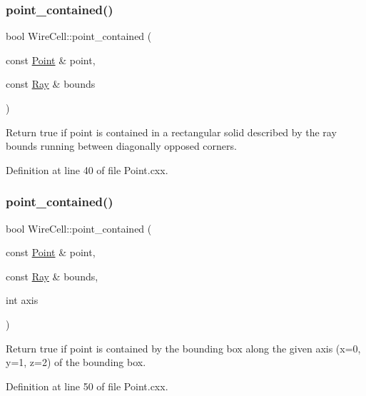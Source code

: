 \subsubsection{\texorpdfstring{point\+\_\+contained()}{point\_contained()}\hspace{0.1cm}{\footnotesize\ttfamily [1/2]}}
{\footnotesize\ttfamily bool Wire\+Cell\+::point\+\_\+contained (\begin{DoxyParamCaption}\item[{const \hyperlink{namespace_wire_cell_ab2b2565fa6432efbb4513c14c988cda9}{Point} \&}]{point,  }\item[{const \hyperlink{namespace_wire_cell_a3ab20d9b438feb7eb1ffaab9ba98af0c}{Ray} \&}]{bounds }\end{DoxyParamCaption})}

Return true if point is contained in a rectangular solid described by the ray bounds running between diagonally opposed corners. 

Definition at line 40 of file Point.\+cxx.

\mbox{\label{namespace_wire_cell_aa2cf1599ea50ce90955cd63654a957a4}} 
\subsubsection{\texorpdfstring{point\+\_\+contained()}{point\_contained()}\hspace{0.1cm}{\footnotesize\ttfamily [2/2]}}
{\footnotesize\ttfamily bool Wire\+Cell\+::point\+\_\+contained (\begin{DoxyParamCaption}\item[{const \hyperlink{namespace_wire_cell_ab2b2565fa6432efbb4513c14c988cda9}{Point} \&}]{point,  }\item[{const \hyperlink{namespace_wire_cell_a3ab20d9b438feb7eb1ffaab9ba98af0c}{Ray} \&}]{bounds,  }\item[{int}]{axis }\end{DoxyParamCaption})}

Return true if point is contained by the bounding box along the given axis (x=0, y=1, z=2) of the bounding box. 

Definition at line 50 of file Point.\+cxx.

\mbox{\label{namespace_wire_cell_a86bf5b387104e6d8db8e9b8fa2d09e9c}} 
